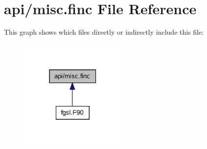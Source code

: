 \hypertarget{misc_8finc}{}\section{api/misc.finc File Reference}
\label{misc_8finc}
This graph shows which files directly or indirectly include this file\+:\nopagebreak
\begin{figure}[H]
\begin{center}
\leavevmode
\includegraphics[width=150pt]{misc_8finc__dep__incl}
\end{center}
\end{figure}
